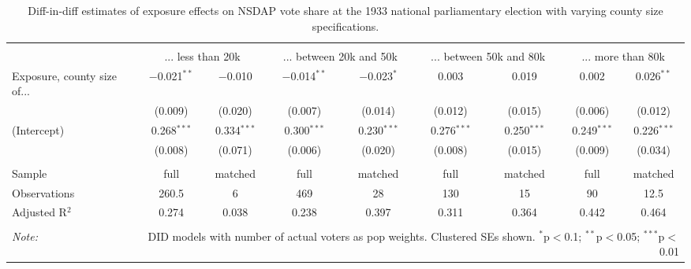
\begin{table}[!htbp] \centering 
  \caption{Diff-in-diff estimates of exposure effects on NSDAP vote share at the 1933 national parliamentary election with varying county size specifications.\vspace{-.25cm}} 
  \label{tab:nsdap-voteshare-countysize-dd-1933} 
\scriptsize 
\begin{tabular}{@{\extracolsep{5pt}}lcccccccc} 
\\[-1.8ex]\hline 
\hline \\[-1.8ex] 
 & \multicolumn{2}{c}{... less than 20k } & \multicolumn{2}{c}{... between 20k and 50k} & \multicolumn{2}{c}{... between 50k and 80k} & \multicolumn{2}{c}{... more than 80k} \\ 
 \cmidrule(r){2-3}\cmidrule(r){4-5}\cmidrule(r){6-7}\cmidrule(r){8-9}Exposure, county size of... & $-$0.021$^{**}$ & $-$0.010 & $-$0.014$^{**}$ & $-$0.023$^{*}$ & 0.003 & 0.019 & 0.002 & 0.026$^{**}$ \\ 
  & (0.009) & (0.020) & (0.007) & (0.014) & (0.012) & (0.015) & (0.006) & (0.012) \\ 
  (Intercept) & 0.268$^{***}$ & 0.334$^{***}$ & 0.300$^{***}$ & 0.230$^{***}$ & 0.276$^{***}$ & 0.250$^{***}$ & 0.249$^{***}$ & 0.226$^{***}$ \\ 
  & (0.008) & (0.071) & (0.006) & (0.020) & (0.008) & (0.015) & (0.009) & (0.034) \\ 
 \hline \\[-1.8ex] 
Sample & full & matched & full & matched & full & matched & full & matched \\ 
Observations & 260.5 & 6 & 469 & 28 & 130 & 15 & 90 & 12.5 \\ 
Adjusted R$^{2}$ & 0.274 & 0.038 & 0.238 & 0.397 & 0.311 & 0.364 & 0.442 & 0.464 \\ 
\hline 
\hline \\[-1.8ex] 
\textit{Note:}  & \multicolumn{8}{r}{DID models with number of actual voters as pop weights. Clustered SEs shown. $^{*}$p$<$0.1; $^{**}$p$<$0.05; $^{***}$p$<$0.01} \\ 
\end{tabular} 
\end{table} 
